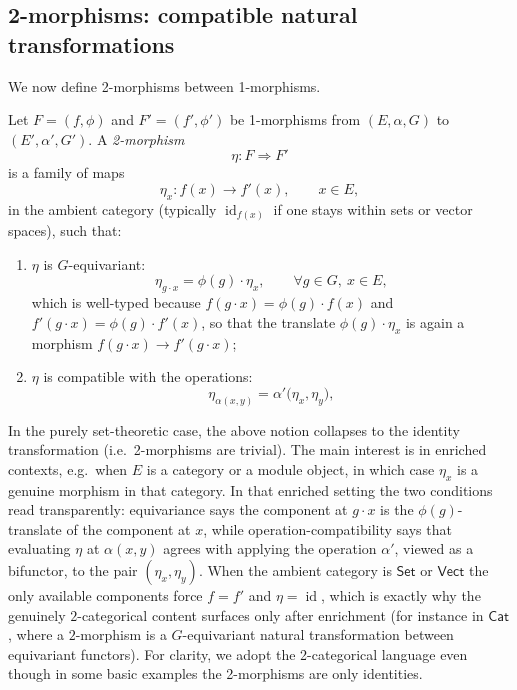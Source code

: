 \documentclass[11pt,a4paper]{article}
\numberwithin{equation}{section}
\DeclareMathOperator{\id}{id}
\newcommand{\TwinSpace}{(E,\alpha,G)}
\begin{document}
	\subsection{2-morphisms: compatible natural transformations}
	
	We now define 2-morphisms between 1-morphisms.
	
	\begin{definition}
		Let $F=(f,\phi)$ and $F'=(f',\phi')$ be 1-morphisms from $\TwinSpace$ to $(E',\alpha',G')$.
		A \emph{2-morphism}
		\[
		\eta : F \Rightarrow F'
		\]
		is a family of maps
		\[
		\eta_x : f(x) \to f'(x), \qquad x\in E,
		\]
		in the ambient category (typically $\id_{f(x)}$ if one stays within sets or vector spaces),
		such that:
		\begin{enumerate}[label=(\alph*)]
			\item $\eta$ is $G$-equivariant:
			\[
			\eta_{g\cdot x} = \phi(g)\cdot \eta_x, \qquad \forall g\in G,\ x\in E,
			\]
			which is well-typed because $f(g\cdot x)=\phi(g)\cdot f(x)$ and $f'(g\cdot x)=\phi(g)\cdot f'(x)$, so that the
			translate $\phi(g)\cdot\eta_x$ is again a morphism $f(g\cdot x)\to f'(g\cdot x)$;
			\item $\eta$ is compatible with the operations:
			\[
			\eta_{\alpha(x,y)} = \alpha'\big(\eta_x,\eta_y\big),
			\]
		\end{enumerate}
	\end{definition}
	
	\begin{remark}
		In the purely set-theoretic case, the above notion collapses to the identity transformation
		(i.e.\ 2-morphisms are trivial). The main interest is in enriched contexts, e.g.\ when $E$ is a category
		or a module object, in which case $\eta_x$ is a genuine morphism in that category. In that enriched setting the
		two conditions read transparently: equivariance says the component at $g\cdot x$ is the $\phi(g)$-translate of
		the component at $x$, while operation-compatibility says that evaluating $\eta$ at $\alpha(x,y)$ agrees with
		applying the operation $\alpha'$, viewed as a bifunctor, to the pair $(\eta_x,\eta_y)$. When the ambient
		category is $\mathsf{Set}$ or $\mathsf{Vect}$ the only available components force $f=f'$ and $\eta=\id$, which
		is exactly why the genuinely $2$-categorical content surfaces only after enrichment (for instance in
		$\mathsf{Cat}$, where a $2$-morphism is a $G$-equivariant natural transformation between equivariant functors).
		For clarity, we adopt the 2-categorical language even though in some basic examples the 2-morphisms are only identities.
	\end{remark}
	
\end{document}
